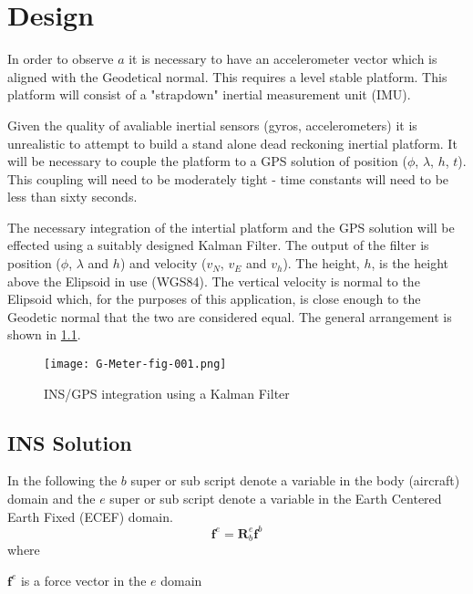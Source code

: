 \documentclass[a4paper]{report}
\numberwithin{equation}{chapter}
\newcommand{\mat}[1]{\boldsymbol{#1}}
\begin{document}
\clearpage\setcounter{page}{1}
\chapter[Design]{Design}

In order to observe $a$ it is necessary to have an accelerometer vector which is aligned with the Geodetical normal. This requires a level stable platform. This platform will consist of a "strapdown" inertial measurement unit (IMU).

\bigskip

Given the quality of avaliable inertial sensors (gyros, accelerometers) it is unrealistic to attempt to build a stand alone dead reckoning inertial platform. It will be necessary to couple the platform to a GPS solution of position ($\phi$, $\lambda$, $h$, $t$). This coupling will need to be moderately tight - time constants will need to be less than sixty seconds.

\bigskip

The necessary integration of the intertial platform and the GPS solution will be effected using a suitably designed Kalman Filter. The output of the filter is position ($\phi$, $\lambda$ and $h$) and velocity ($v_N$, $v_E$ and $v_h$). The height, $h$, is the height above the Elipsoid in use (WGS84). The vertical velocity is normal to the Elipsoid which, for the purposes of this application, is close enough to the Geodetic normal that the two are considered equal. The general arrangement is shown in \ref{fig:001}.
\begin{figure}
\centering
\texttt{[image: G-Meter-fig-001.png]}
\caption[INS/GPS integration using a Kalman Filter]{INS/GPS integration using a Kalman Filter}
\label{fig:001}
\end{figure}

\section[INS Solution]{INS Solution}

In the following the $b$ super or sub script denote a variable in the body (aircraft) domain and the $e$ super or sub script denote a variable in the Earth Centered Earth Fixed (ECEF) domain.
\begin{equation}
\mat{f}^e = \mat{R}^e_b \mat{f}^b
\label{eqn:BodytoECEFForce}
\end{equation}
where

  $\mat{f}^e$ is a force vector in the $e$ domain
\end{document}

